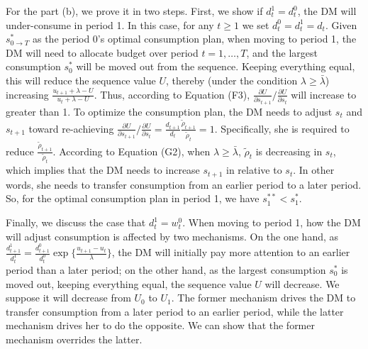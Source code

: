 \documentclass[
  12pt,
]{article}
\begin{document}
For the part (b), we prove it in two steps. First, we show if
\(d_t^1=d_t^0\), the DM will under-consume in period 1. In this case,
for any \(t\geq 1\) we set \(d_t^0=d_t^1=d_t\). Given
\(s_{0\rightarrow T}^*\) as the period 0's optimal consumption plan,
when moving to period 1, the DM will need to allocate budget over period
\(t=1,…,T\), and the largest consumption \(s_0^*\) will be moved out
from the sequence. Keeping everything equal, this will reduce the
sequence value \(U\), thereby (under the condition
\(\lambda\geq \bar{\lambda}\)) increasing
\(\frac{u_{t+1}+\lambda-U}{u_t+\lambda-U}\). Thus, according to Equation
(F3),
\(\frac{\partial U}{\partial s_{t+1}}/\frac{\partial U}{\partial s_{t}}\)
will increase to greater than 1. To optimize the consumption plan, the
DM needs to adjust \(s_t\) and \(s_{t+1}\) toward re-achieving
\(\frac{\partial U}{\partial s_{t+1}}/\frac{\partial U}{\partial s_{t}}=\frac{d_{t+1}}{d_t}\frac{\tilde{\rho}_{t+1}}{\tilde{\rho}_t}=1\).
Specifically, she is required to reduce
\(\frac{\tilde{\rho}_{t+1}}{\tilde{\rho}_t}\). According to Equation
(G2), when \(\lambda\geq\bar{\lambda}\), \(\tilde{\rho}_t\) is
decreasing in \(s_t\), which implies that the DM needs to increase
\(s_{t+1}\) in relative to \(s_t\). In other words, she needs to
transfer consumption from an earlier period to a later period. So, for
the optimal consumption plan in period 1, we have \(s_1^{**}<s_1^*\).

Finally, we discuss the case that \(d_t^1=w_t^0\). When moving to period
1, how the DM will adjust consumption is affected by two mechanisms. On
the one hand, as
\(\frac{d_{t+1}^1}{d_t^1}=\frac{d_{t+1}^0}{d_t^0}\exp\{\frac{u_{t+1}-u_t}{\lambda}\}\),
the DM will initially pay more attention to an earlier period than a
later period; on the other hand, as the largest consumption \(s_0^*\) is
moved out, keeping everything equal, the sequence value \(U\) will
decrease. We suppose it will decrease from \(U_0\) to \(U_1\). The
former mechanism drives the DM to transfer consumption from a later
period to an earlier period, while the latter mechanism drives her to do
the opposite. We can show that the former mechanism overrides the
latter.
\end{document}
